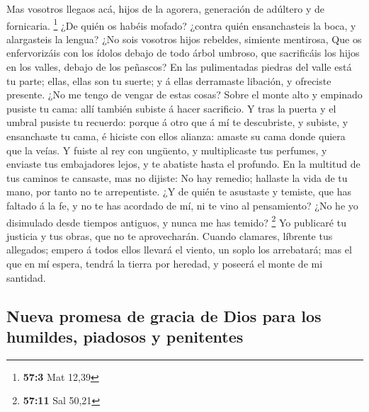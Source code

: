  Mas vosotros llegaos acá, hijos de la agorera, generación
de adúltero y de fornicaria. \footnote{\textbf{57:3} Mat 12,39}
 ¿De quién os habéis mofado? ¿contra quién ensanchasteis la
boca, y alargasteis la lengua? ¿No sois vosotros hijos rebeldes,
simiente mentirosa,  Que os enfervorizáis con los ídolos
debajo de todo árbol umbroso, que sacrificáis los hijos en los valles,
debajo de los peñascos?  En las pulimentadas piedras del
valle está tu parte; ellas, ellas son tu suerte; y á ellas derramaste
libación, y ofreciste presente. ¿No me tengo de vengar de estas cosas?
 Sobre el monte alto y empinado pusiste tu cama: allí
también subiste á hacer sacrificio.  Y tras la puerta y el
umbral pusiste tu recuerdo: porque á otro que á mí te descubriste, y
subiste, y ensanchaste tu cama, é hiciste con ellos alianza: amaste su
cama donde quiera que la veías.  Y fuiste al rey con
ungüento, y multiplicaste tus perfumes, y enviaste tus embajadores
lejos, y te abatiste hasta el profundo.  En la multitud de
tus caminos te cansaste, mas no dijiste: No hay remedio; hallaste la
vida de tu mano, por tanto no te arrepentiste.  ¿Y de quién
te asustaste y temiste, que has faltado á la fe, y no te has acordado de
mí, ni te vino al pensamiento? ¿No he yo disimulado desde tiempos
antiguos, y nunca me has temido? \footnote{\textbf{57:11} Sal 50,21}
 Yo publicaré tu justicia y tus obras, que no te
aprovecharán.  Cuando clamares, líbrente tus allegados;
empero á todos ellos llevará el viento, un soplo los arrebatará; mas el
que en mí espera, tendrá la tierra por heredad, y poseerá el monte de mi
santidad.

\hypertarget{nueva-promesa-de-gracia-de-dios-para-los-humildes-piadosos-y-penitentes}{%
\subsection{Nueva promesa de gracia de Dios para los humildes, piadosos
y
penitentes}\label{nueva-promesa-de-gracia-de-dios-para-los-humildes-piadosos-y-penitentes}}

